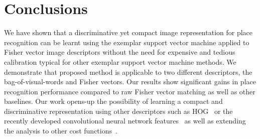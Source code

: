 \documentclass[10pt,twocolumn,letterpaper]{article}
\begin{document}
   \section{Conclusions}
      We have shown that a discriminative yet compact image representation for place recognition can be learnt using the exemplar support vector machine applied to Fisher vector image descriptors without the need for expensive and tedious calibration typical for other exemplar  support vector machine methods. 
      \textcolor{petr}{We demonstrate that proposed method is applicable to two different descriptors, the bag-of-visual-words and Fisher vectors.}
      Our results show significant gains in place recognition performance compared to raw Fisher vector matching as well as other baselines. Our work opens-up the possibility of learning a compact and discriminative representation using other descriptors such as HOG~\cite{Dalal05} or the recently developed convolutional neural network features~\cite{Donahue13,Krizhevsky12,Oquab14,Sermanet13} as well as extending the analysis to other cost functions~\cite{Gharbi12,Hariharan12}. 

\small{
   
   
}
\end{document}

